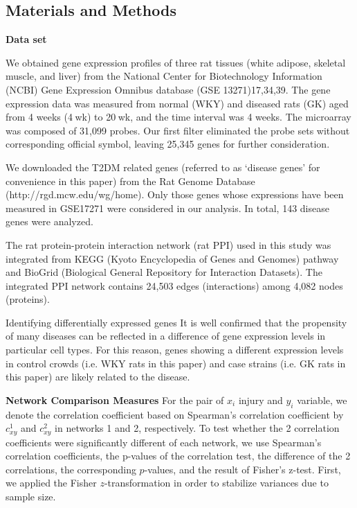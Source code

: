 \subsection{Materials and Methods}

\textbf{Data set}

We obtained gene expression profiles of three rat tissues (white adipose, skeletal muscle, and liver) from the National Center for Biotechnology Information (NCBI) Gene Expression Omnibus database (GSE 13271)17,34,39. The gene expression data was measured from normal (WKY) and diseased rats (GK) aged from 4 weeks (4 wk) to 20 wk, and the time interval was 4 weeks. The microarray was composed of 31,099 probes. Our first filter eliminated the probe sets without corresponding official symbol, leaving 25,345 genes for further consideration.

We downloaded the T2DM related genes (referred to as ‘disease genes’ for convenience in this paper) from the Rat Genome Database (http://rgd.mcw.edu/wg/home). Only those genes whose expressions have been measured in GSE17271 were considered in our analysis. In total, 143 disease genes were analyzed.

The rat protein-protein interaction network (rat PPI) used in this study was integrated from KEGG (Kyoto Encyclopedia of Genes and Genomes) pathway and BioGrid (Biological General Repository for Interaction Datasets). The integrated PPI network contains 24,503 edges (interactions) among 4,082 nodes (proteins).

Identifying differentially expressed genes
It is well confirmed that the propensity of many diseases can be reflected in a difference of gene expression levels in particular cell types. For this reason, genes showing a different expression levels in control crowds (i.e. WKY rats in this paper) and case strains (i.e. GK rats in this paper) are likely related to the disease.


\textbf{Network Comparison Measures}
For the pair of $x_{i}$ injury and $y_{i}$ variable, we denote the correlation coefficient based on Spearman's correlation coefficient by $c_{xy}^1$ and $c_{xy}^2$ in networks 1 and 2, respectively. To test whether the 2 correlation coefficients were significantly different of each network, we use Spearman's correlation coefficients, the p-values of the correlation test, the difference of the 2 correlations, the corresponding $p$-values, and the result of Fisher's z-test. First, we applied the Fisher $z$-transformation in order to stabilize variances due to sample size.

